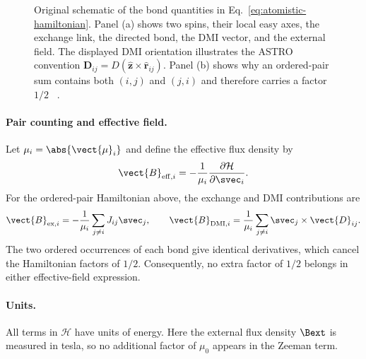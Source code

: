 \begin{figure}[htbp]
    \caption{Original schematic of the bond quantities in
    Eq.~\eqref{eq:atomistic-hamiltonian}.  Panel (a) shows two spins, their local
    easy axes, the exchange link, the directed bond, the DMI vector, and the
    external field.  The displayed DMI orientation illustrates the ASTRO
    convention $\mathbf D_{ij}=D(\hat{\mathbf z}\times
    \hat{\mathbf r}_{ij})$.  Panel (b) shows why an ordered-pair sum contains
    both $(i,j)$ and $(j,i)$ and therefore carries a factor $1/2$
    ~\cite{astro-code}.}
    \label{fig:atomistic-bond-interactions}
\end{figure}

\paragraph{Pair counting and effective field.}
Let $\mu_i=\abs{\vect{\mu}_i}$ and define the effective flux density by
\begin{equation}
    \vect{B}_{\mathrm{eff},i}
    =-\frac{1}{\mu_i}\frac{\partial\mathcal{H}}{\partial\svec_i}.
    \label{eq:atomistic-effective-field}
\end{equation}
For the ordered-pair Hamiltonian above, the exchange and DMI contributions are
\begin{equation}
    \vect{B}_{\mathrm{ex},i}
    =-\frac{1}{\mu_i}\sum_{j\ne i}J_{ij}\svec_j,
    \qquad
    \vect{B}_{\mathrm{DMI},i}
    =\frac{1}{\mu_i}\sum_{j\ne i}\svec_j\times\vect{D}_{ij}.
    \label{eq:atomistic-pair-fields}
\end{equation}
The two ordered occurrences of each bond give identical derivatives, which
cancel the Hamiltonian factors of $1/2$.  Consequently, no extra factor of
$1/2$ belongs in either effective-field expression.

\paragraph{Units.}
All terms in $\mathcal{H}$ have units of energy.  Here the external flux density
$\Bext$ is measured in tesla, so no additional factor of $\mu_0$ appears in the
Zeeman term.

